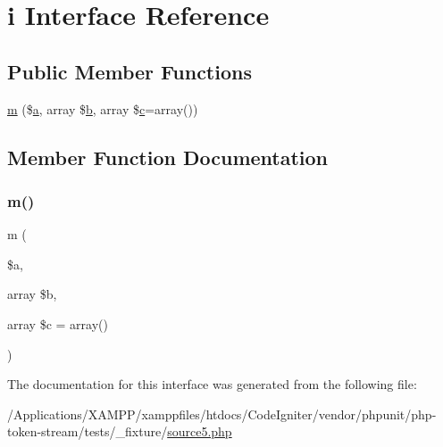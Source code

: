 \hypertarget{interfacei}{}\section{i Interface Reference}
\label{interfacei}
\subsection*{Public Member Functions}
\begin{DoxyCompactItemize}
\item 
\mbox{\hyperlink{interfacei_a0fd5ec041a095f0feb67e713f0685716}{m}} (\$\mbox{\hyperlink{interfacea}{a}}, array \$\mbox{\hyperlink{interfaceb}{b}}, array \$\mbox{\hyperlink{classc}{c}}=array())
\end{DoxyCompactItemize}


\subsection{Member Function Documentation}
\mbox{\label{interfacei_a0fd5ec041a095f0feb67e713f0685716}} 
\subsubsection{\texorpdfstring{m()}{m()}}
{\footnotesize\ttfamily m (\begin{DoxyParamCaption}\item[{}]{\$a,  }\item[{array}]{\$b,  }\item[{array}]{\$c = {\ttfamily array()} }\end{DoxyParamCaption})}



The documentation for this interface was generated from the following file\+:\begin{DoxyCompactItemize}
\item 
/\+Applications/\+X\+A\+M\+P\+P/xamppfiles/htdocs/\+Code\+Igniter/vendor/phpunit/php-\/token-\/stream/tests/\+\_\+fixture/\mbox{\hyperlink{source5_8php}{source5.\+php}}\end{DoxyCompactItemize}
